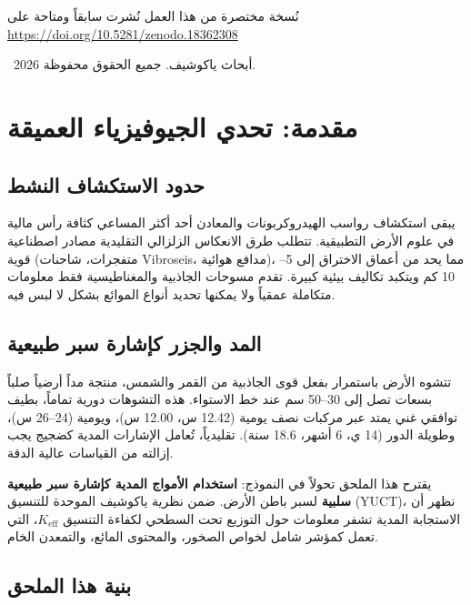 \documentclass[12pt,a4paper]{article}
\newcommand{\Keff}{K_{\mathrm{eff}}}
\theoremstyle{remark}
\begin{document}
	\vspace{0.5cm}
	\noindent
	{\small نُسخة مختصرة من هذا العمل نُشرت سابقاً ومتاحة على \\ \url{https://doi.org/10.5281/zenodo.18362308}}
	\vspace{0.5cm}
	
	\noindent
	\textcopyright\ 2026 أبحاث ياكوشيف. جميع الحقوق محفوظة.
	
	\tableofcontents
	\newpage
	
	\section{مقدمة: تحدي الجيوفيزياء العميقة}
	\label{sec:intro}
	
	\subsection{حدود الاستكشاف النشط}
	
	يبقى استكشاف رواسب الهيدروكربونات والمعادن أحد أكثر المساعي كثافة رأس مالية في علوم الأرض التطبيقية. تتطلب طرق الانعكاس الزلزالي التقليدية مصادر اصطناعية قوية (متفجرات، شاحنات Vibroseis، مدافع هوائية)، مما يحد من أعماق الاختراق إلى 5–10 كم ويتكبد تكاليف بيئية كبيرة. تقدم مسوحات الجاذبية والمغناطيسية فقط معلومات متكاملة عمقياً ولا يمكنها تحديد أنواع الموائع بشكل لا لبس فيه.
	
	\subsection{المد والجزر كإشارة سبر طبيعية}
	
	تتشوه الأرض باستمرار بفعل قوى الجاذبية من القمر والشمس، منتجة مداً أرضياً صلباً بسعات تصل إلى 30–50 سم عند خط الاستواء. هذه التشوهات دورية تماماً، بطيف توافقي غني يمتد عبر مركبات نصف يومية (12.42 س، 12.00 س)، ويومية (24–26 س)، وطويلة الدور (14 ي، 6 أشهر، 18.6 سنة). تقليدياً، تُعامل الإشارات المدية كضجيج يجب إزالته من القياسات عالية الدقة.
	
	يقترح هذا الملحق تحولاً في النموذج: \textbf{استخدام الأمواج المدية كإشارة سبر طبيعية سلبية} لسبر باطن الأرض. ضمن نظرية ياكوشيف الموحدة للتنسيق (YUCT)، نظهر أن الاستجابة المدية تشفر معلومات حول التوزيع تحت السطحي لكفاءة التنسيق \(\Keff\)، التي تعمل كمؤشر شامل لخواص الصخور، والمحتوى المائع، والتمعدن الخام.
	
	\subsection{بنية هذا الملحق}
	
\end{document}
